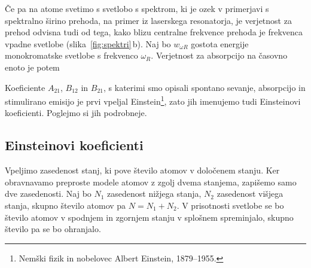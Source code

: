 Če pa na atome svetimo s svetlobo s spektrom, ki je ozek v primerjavi s spektralno 
širino prehoda, na primer iz laserskega resonatorja, je verjetnost za prehod 
odvisna tudi od tega, kako blizu centralne frekvence prehoda je frekvenca vpadne 
svetlobe (slika~\ref{fig:spektri}\,b). Naj bo  $w_{\omega R}$ gostota energije 
monokromatske svetlobe s frekvenco $\omega_R$. Verjetnost za absorpcijo na časovno 
enoto je potem  

Koeficiente $A_{21}$, $B_{12}$ in $B_{21}$, s katerimi smo opisali spontano sevanje,
absorpcijo in stimulirano emisijo je prvi vpeljal Einstein\footnote{Nemški fizik
in nobelovec Albert Einstein, 1879--1955.}, zato jih imenujemo 
tudi Einsteinovi koeficienti. Poglejmo si jih podrobneje.

\subsection*{Einsteinovi koeficienti}
\label{AB}
Vpeljimo zasedenost stanj, ki pove število 
atomov v določenem stanju. Ker obravnavamo preproste modele atomov z zgolj 
dvema stanjema, zapišemo samo dve zasedenosti. Naj bo $N_1$ zasedenost 
nižjega stanja, $N_{2}$ zasedenost višjega stanja, skupno število atomov pa
$N=N_1+N_2$. V prisotnosti svetlobe 
se bo število atomov v spodnjem in zgornjem stanju v splošnem spreminjalo, skupno 
število pa se bo ohranjalo.


